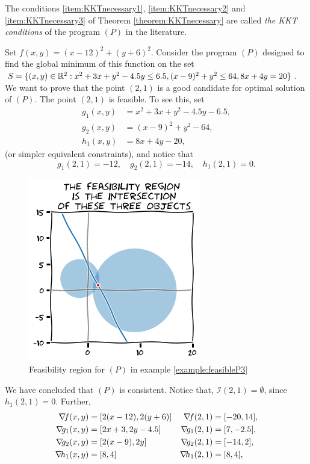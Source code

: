 \begin{remark}
The conditions \ref{item:KKTnecessary1}, \ref{item:KKTnecessary2} and \ref{item:KKTnecessary3} of Theorem \ref{theorem:KKTnecessary} are called \emph{the KKT conditions} of the program $(P)$ in the literature.
\end{remark}

\begin{example}\label{example:feasibleP3}
Set $f(x,y)=(x-12)^2+(y+6)^2$.  Consider the program $(P)$ designed to find the global minimum of this function on the set $S=\{ (x,y) \in \mathbb{R}^2 : x^2+3x+y^2-4.5y \leq 6.5, (x-9)^2 +y^2 \leq 64, 8x+4y=20 \}$.  We want to prove that the point $(2,1)$ is a good candidate for optimal solution of $(P)$.
The point $(2,1)$ is feasible.  To see this, set 
\begin{align*}
g_1(x,y) &=x^2+3x+y^2-4.5y-6.5, \\
g_2(x,y) &=(x-9)^2+y^2-64, \\
h_1(x,y) &=8x+4y-20,
\end{align*}
(or simpler equivalent constraints), and notice that
\begin{equation*}
g_1(2,1)=-12, \quad g_2(2,1)=-14, \quad h_1(2,1)=0.
\end{equation*}
\begin{figure}[ht!]
\includegraphics[width=0.5\linewidth]{images/feasibleP3.png}
\caption{Feasibility region for $(P)$ in example \ref{example:feasibleP3}}
\label{figure:feasibleP3}
\end{figure}
We have concluded that $(P)$ is consistent.  Notice that, $\mathcal{I}(2,1)=\emptyset$, since $h_1(2,1) = 0$.  Further,
\begin{align*}
\gradient{f}(x,y)   &= [ 2(x-12), 2(y+6) ] &\gradient{f}(2,1)   &= [-20, 14], \\
\gradient{g_1}(x,y) &= [ 2x+3, 2y-4.5 ]    &\gradient{g_1}(2,1) &= [  7, -2.5], \\
\gradient{g_2}(x,y) &= [ 2(x-9), 2y ]      &\gradient{g_2}(2,1) &= [-14, 2], \\
\gradient{h_1}(x,y) &= [ 8, 4]             &\gradient{h_1}(2,1) &= [  8, 4], 
\end{align*}


\end{example}
